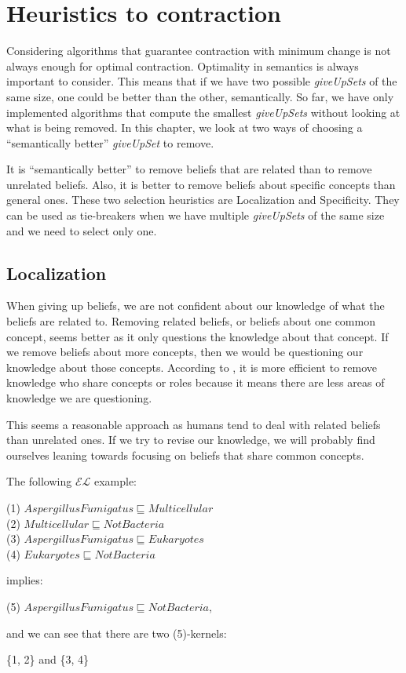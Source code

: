 \chapter{Heuristics to contraction}
Considering algorithms that guarantee contraction with minimum change is not always enough for optimal contraction. Optimality in semantics is always important to consider. This means that if we have two possible \textit{giveUpSets} of the same size, one could be better than the other, semantically. So far, we have only implemented algorithms that compute the smallest \textit{giveUpSets} without looking at what is being removed. In this chapter, we look at two ways of choosing a ``semantically better'' \textit{giveUpSet} to remove. 

It is ``semantically better'' to remove beliefs that are related than to remove unrelated beliefs. Also, it is better to remove beliefs about specific concepts than general ones. These two selection heuristics are Localization and Specificity. They can be used as tie-breakers when we have multiple \textit{giveUpSets} of the same size and we need to select only one.

\section{Localization}
When giving up beliefs, we are not confident about our knowledge of what the beliefs are related to. Removing related beliefs, or beliefs about one common concept, seems better as it only questions the knowledge about that concept. If we remove beliefs about more concepts, then we would be questioning our knowledge about those concepts. According to \cite{zwei}, it is more efficient to remove knowledge who share concepts or roles because it means there are less areas of knowledge we are questioning.

This seems a reasonable approach as humans tend to deal with related beliefs than unrelated ones. If we try to revise our knowledge, we will probably find ourselves leaning towards focusing on beliefs that share common concepts. 

The following $\mathcal{EL}$ example:
\begin{center}
(1) $AspergillusFumigatus \sqsubseteq Multicellular $ \\
(2) $Multicellular \sqsubseteq NotBacteria$ \\
(3) $AspergillusFumigatus \sqsubseteq Eukaryotes$ \\
(4) $Eukaryotes \sqsubseteq NotBacteria$ 
\end{center}
implies:
\begin{center}
(5) $AspergillusFumigatus \sqsubseteq NotBacteria$,
\end{center}
and we can see that there are two (5)-kernels:
\begin{center}
\{1, 2\} and \{3, 4\}
\end{center}

